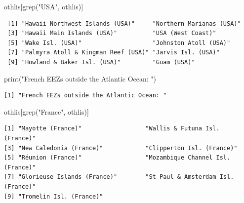 \documentclass[
]{article}
\newenvironment{Shaded}{\begin{snugshade}}{\end{snugshade}}
\newcommand{\CommentTok}[1]{\textcolor[rgb]{0.37,0.37,0.37}{#1}}
\newcommand{\FunctionTok}[1]{\textcolor[rgb]{0.28,0.35,0.67}{#1}}
\newcommand{\NormalTok}[1]{\textcolor[rgb]{0.00,0.23,0.31}{#1}}
\newcommand{\SpecialCharTok}[1]{\textcolor[rgb]{0.37,0.37,0.37}{#1}}
\newcommand{\StringTok}[1]{\textcolor[rgb]{0.13,0.47,0.30}{#1}}
\begin{document}
\begin{Shaded}
\begin{Highlighting}[]
\NormalTok{othlis[}\FunctionTok{grep}\NormalTok{(}\StringTok{"USA"}\NormalTok{, othlis)]}
\end{Highlighting}
\end{Shaded}

\begin{verbatim}
 [1] "Hawaii Northwest Islands (USA)"     "Northern Marianas (USA)"           
 [3] "Hawaii Main Islands (USA)"          "USA (West Coast)"                  
 [5] "Wake Isl. (USA)"                    "Johnston Atoll (USA)"              
 [7] "Palmyra Atoll & Kingman Reef (USA)" "Jarvis Isl. (USA)"                 
 [9] "Howland & Baker Isl. (USA)"         "Guam (USA)"                        
\end{verbatim}

\begin{Shaded}
\begin{Highlighting}[]
\FunctionTok{print}\NormalTok{(}\StringTok{"French EEZs outside the Atlantic Ocean: "}\NormalTok{)}
\end{Highlighting}
\end{Shaded}

\begin{verbatim}
[1] "French EEZs outside the Atlantic Ocean: "
\end{verbatim}

\begin{Shaded}
\begin{Highlighting}[]
\NormalTok{othlis[}\FunctionTok{grep}\NormalTok{(}\StringTok{"France"}\NormalTok{, othlis)]}
\end{Highlighting}
\end{Shaded}

\begin{verbatim}
[1] "Mayotte (France)"                  "Wallis & Futuna Isl. (France)"    
[3] "New Caledonia (France)"            "Clipperton Isl. (France)"         
[5] "Réunion (France)"                  "Mozambique Channel Isl. (France)" 
[7] "Glorieuse Islands (France)"        "St Paul & Amsterdam Isl. (France)"
[9] "Tromelin Isl. (France)"           
\end{verbatim}

\begin{Shaded}
\end{Shaded}
\end{document}
